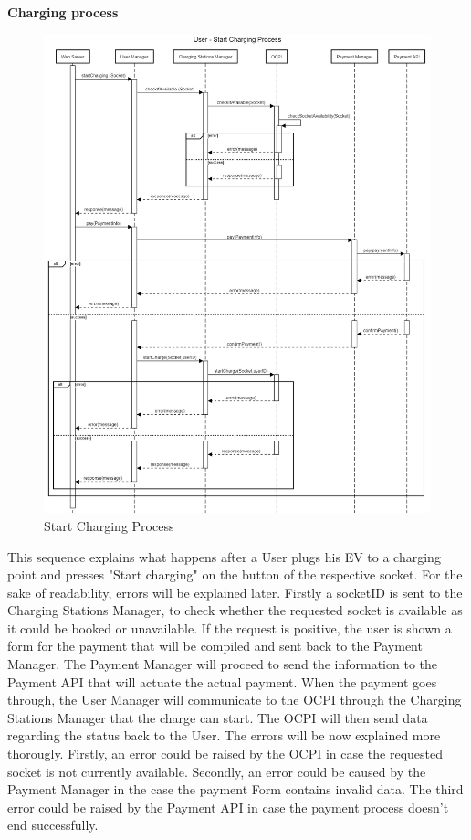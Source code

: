\documentclass[table, 12pt]{article}
\begin{document}
\newpage
\textbf{Charging process}
\begin{center}
    \begin{figure}[H]
        \includegraphics[scale=0.10, center]{assets/sequenceDiagrams/User Start Charging Process.png}
        \caption{Start Charging Process}
        \label{Start Charging Process}
    \end{figure}
\end{center}
This sequence explains what happens after a User plugs his EV to a charging point and presses "Start charging" on the button of the respective socket. For the sake of readability, errors will be explained later.\newline
Firstly a socketID is sent to the Charging Stations Manager, to check whether the requested socket is available as it could be booked or unavailable. If the request is positive, the user is shown
a form for the payment that will be compiled and sent back to the Payment Manager. The Payment Manager will proceed to send the information to the Payment API that will actuate the actual payment.
When the payment goes through, the User Manager will communicate to the OCPI through the Charging Stations Manager that the charge can start. The OCPI will then send data regarding the status back to the User.
The errors will be now explained more thorougly. \newline Firstly, an error could be raised by the OCPI in case the requested socket is not currently available.
Secondly, an error could be caused by the Payment Manager in the case the payment Form contains invalid data. The third error could be raised by the Payment API in case the payment process doesn't end successfully.
\end{document}
